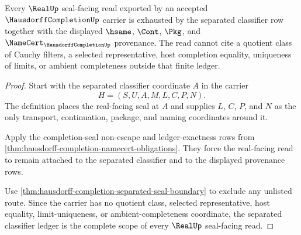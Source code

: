 \begin{theorem}
\label{thm:hausdorff-completion-real-seal-ledger-scope}
Every $\RealUp$ seal-facing read exported by an accepted $\HausdorffCompletionUp$ carrier is exhausted by the separated classifier row together with the displayed $\hsame$, $\Cont$, $\Pkg$, and $\NameCert_{\HausdorffCompletionUp}$ provenance. The read cannot cite a quotient class of Cauchy filters, a selected representative, host completion equality, uniqueness of limits, or ambient completeness outside that finite ledger.
\end{theorem}
\begin{proof}
Start with the separated classifier coordinate $A$ in the carrier
$$
H=(S,U,A,M,L,C,P,N).
$$
The definition places the real-facing seal at $A$ and supplies $L$, $C$, $P$, and $N$ as the only transport, continuation, package, and naming coordinates around it.

Apply the completion-seal non-escape and ledger-exactness rows from \autoref{thm:hausdorff-completion-namecert-obligations}. They force the real-facing read to remain attached to the separated classifier and to the displayed provenance rows.

Use \autoref{thm:hausdorff-completion-separated-seal-boundary} to exclude any unlisted route. Since the carrier has no quotient class, selected representative, host equality, limit-uniqueness, or ambient-completeness coordinate, the separated classifier ledger is the complete scope of every $\RealUp$ seal-facing read.
\end{proof}

